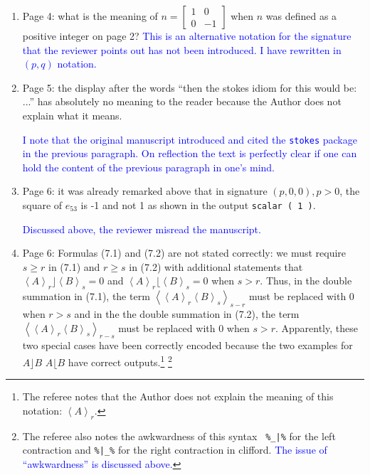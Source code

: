 \documentclass{article}
\begin{document}
\begin{enumerate}
\item Page 4: what is the meaning of
  $n=\left[\begin{array}{cc}1&0\\0&-1\end{array}\right]$ when $n$ was
  defined as a positive integer on page 2?  \textcolor{blue}{This is
    an alternative notation for the signature that the reviewer points
    out has not been introduced.  I have rewritten in $(p,q)$
    notation.}

  \item Page 5: the display after the words
“then the stokes idiom for this would be: ...” has absolutely no
meaning to the reader because the Author does not explain what it
means.

\textcolor{blue}{I note that the original manuscript introduced and
  cited the {\tt stokes} package in the previous paragraph.  On
  reflection the text is perfectly clear if one can hold the content
  of the previous paragraph in one's mind.}

\item Page 6: it was already remarked above that in signature $(p, 0,
  0), p > 0$, the square of $e_{53}$ is -1 and not 1 as shown in the
  output \verb+scalar ( 1 )+.

\textcolor{blue}{Discussed above, the reviewer misread the
  manuscript.}

  \item Page 6: Formulas (7.1) and (7.2) are not stated correctly: we
    must require $s\geq r$ in (7.1) and $r \geq s$ in (7.2) with
    additional statements that $\left\langle
    A\right\rangle_r\rfloor\left\langle B\right\rangle_s=0$ and
    $\left\langle A\right\rangle_r\lfloor\left\langle
    B\right\rangle_s=0$ when $s > r$.  Thus, in the double summation
    in (7.1), the term $\left\langle\left\langle
    A\right\rangle_r\left\langle B\right\rangle_s\right\rangle_{s-r}$
    must be replaced with 0 when $r > s$ and in the the double
    summation in (7.2), the term $\left\langle\left\langle
    A\right\rangle_r\left\langle B\right\rangle_s\right\rangle_{r-s}$
    must be replaced with 0 when $s>r$. Apparently, these two special
    cases have been correctly encoded because the two examples for
    $A\rfloor B$ $A\lfloor B$ have correct outputs.\footnote{The referee notes that the Author does not explain the
meaning of this notation: $\left\langle A\right\rangle_r$.}
\footnote{The referee also notes the awkwardness of this syntax {\tt
  \%\_|\%} for the left contraction and {\tt \%|\_\%} for the right
contraction in clifford.\textcolor{blue}{ The issue of ``awkwardness''
  is discussed above.}}


\end{enumerate}
\end{document}
